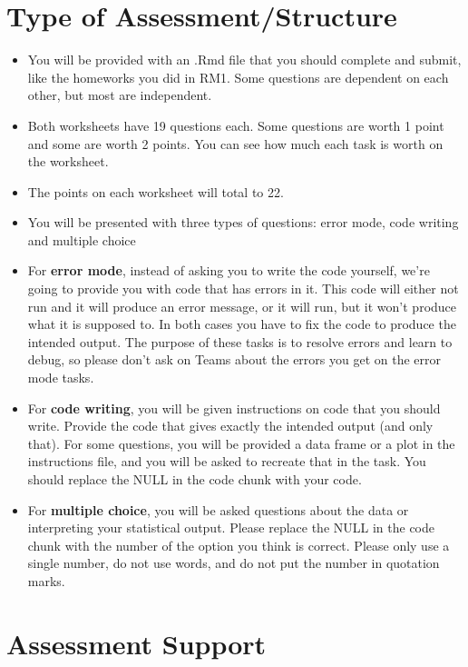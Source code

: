 \documentclass[
  english,
  letterpaper,
  DIV=11,
  numbers=noendperiod]{scrreprt}
\begin{document}
\section{Type of
Assessment/Structure}\label{type-of-assessmentstructure}

\begin{itemize}
\item
  You will be provided with an .Rmd file that you should complete and
  submit, like the homeworks you did in RM1. Some questions are
  dependent on each other, but most are independent.
\item
  Both worksheets have 19 questions each. Some questions are worth 1
  point and some are worth 2 points. You can see how much each task is
  worth on the worksheet.
\item
  The points on each worksheet will total to 22.
\item
  You will be presented with three types of questions: error mode, code
  writing and multiple choice
\item
  For \textbf{error mode}, instead of asking you to write the code
  yourself, we're going to provide you with code that has errors in it.
  This code will either not run and it will produce an error message, or
  it will run, but it won't produce what it is supposed to. In both
  cases you have to fix the code to produce the intended output. The
  purpose of these tasks is to resolve errors and learn to debug, so
  please don't ask on Teams about the errors you get on the error mode
  tasks.
\item
  For \textbf{code writing}, you will be given instructions on code that
  you should write. Provide the code that gives exactly the intended
  output (and only that). For some questions, you will be provided a
  data frame or a plot in the instructions file, and you will be asked
  to recreate that in the task. You should replace the NULL in the code
  chunk with your code.
\item
  For \textbf{multiple choice}, you will be asked questions about the
  data or interpreting your statistical output. Please replace the NULL
  in the code chunk with the number of the option you think is correct.
  Please only use a single number, do not use words, and do not put the
  number in quotation marks.
\end{itemize}

\section{Assessment Support}\label{assessment-support}
\end{document}
